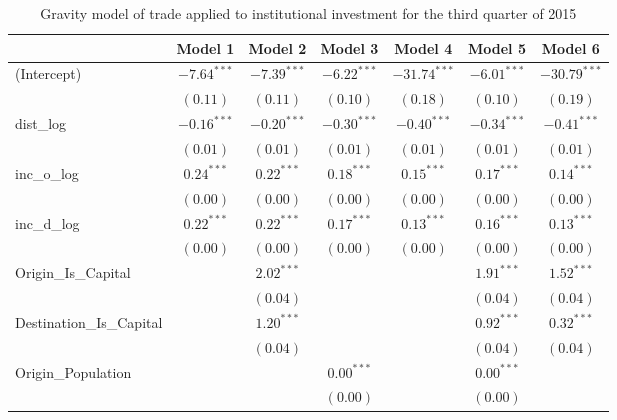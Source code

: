 \begin{table}
	\begin{center}
		\small
		\caption[CGravity Model of Trade for Q3 2015]{Gravity model of trade applied to institutional investment for the third quarter of 2015}
		\begin{tabular}{l c c c c c c }
			\hline
			& Model 1 & Model 2 & Model 3 & Model 4 & Model 5 & Model 6 \\
			\hline
			(Intercept)                  & $-7.64^{***}$ & $-7.39^{***}$ & $-6.22^{***}$ & $-31.74^{***}$ & $-6.01^{***}$ & $-30.79^{***}$ \\
			& $(0.11)$      & $(0.11)$      & $(0.10)$      & $(0.18)$       & $(0.10)$      & $(0.19)$       \\
			dist\_log                    & $-0.16^{***}$ & $-0.20^{***}$ & $-0.30^{***}$ & $-0.40^{***}$  & $-0.34^{***}$ & $-0.41^{***}$  \\
			& $(0.01)$      & $(0.01)$      & $(0.01)$      & $(0.01)$       & $(0.01)$      & $(0.01)$       \\
			inc\_o\_log                  & $0.24^{***}$  & $0.22^{***}$  & $0.18^{***}$  & $0.15^{***}$   & $0.17^{***}$  & $0.14^{***}$   \\
			& $(0.00)$      & $(0.00)$      & $(0.00)$      & $(0.00)$       & $(0.00)$      & $(0.00)$       \\
			inc\_d\_log                  & $0.22^{***}$  & $0.22^{***}$  & $0.17^{***}$  & $0.13^{***}$   & $0.16^{***}$  & $0.13^{***}$   \\
			& $(0.00)$      & $(0.00)$      & $(0.00)$      & $(0.00)$       & $(0.00)$      & $(0.00)$       \\
			Origin\_Is\_Capital          &               & $2.02^{***}$  &               &                & $1.91^{***}$  & $1.52^{***}$   \\
			&               & $(0.04)$      &               &                & $(0.04)$      & $(0.04)$       \\
			Destination\_Is\_Capital     &               & $1.20^{***}$  &               &                & $0.92^{***}$  & $0.32^{***}$   \\
			&               & $(0.04)$      &               &                & $(0.04)$      & $(0.04)$       \\
			Origin\_Population           &               &               & $0.00^{***}$  &                & $0.00^{***}$  &                \\
			&               &               & $(0.00)$      &                & $(0.00)$      &                \\

\end{tabular}
\end{center}
\end{table}
